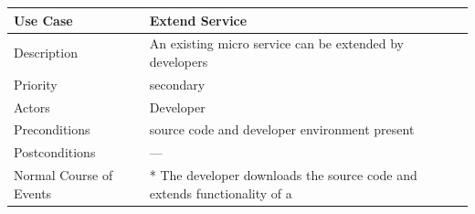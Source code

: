 \begin{longtable}[]{@{}ll@{}}
\toprule
\begin{minipage}[b]{0.27\columnwidth}\raggedright\strut
\textbf{Use Case}\strut
\end{minipage} & \begin{minipage}[b]{0.68\columnwidth}\raggedright\strut
\textbf{Extend Service}\strut
\end{minipage}\tabularnewline
\midrule
\endhead
\begin{minipage}[t]{0.27\columnwidth}\raggedright\strut
Description\strut
\end{minipage} & \begin{minipage}[t]{0.68\columnwidth}\raggedright\strut
An existing micro service can be extended by developers\strut
\end{minipage}\tabularnewline
\begin{minipage}[t]{0.27\columnwidth}\raggedright\strut
Priority\strut
\end{minipage} & \begin{minipage}[t]{0.68\columnwidth}\raggedright\strut
secondary\strut
\end{minipage}\tabularnewline
\begin{minipage}[t]{0.27\columnwidth}\raggedright\strut
Actors\strut
\end{minipage} & \begin{minipage}[t]{0.68\columnwidth}\raggedright\strut
Developer\strut
\end{minipage}\tabularnewline
\begin{minipage}[t]{0.27\columnwidth}\raggedright\strut
Preconditions\strut
\end{minipage} & \begin{minipage}[t]{0.68\columnwidth}\raggedright\strut
source code and developer environment present\strut
\end{minipage}\tabularnewline
\begin{minipage}[t]{0.27\columnwidth}\raggedright\strut
Postconditions\strut
\end{minipage} & \begin{minipage}[t]{0.68\columnwidth}\raggedright\strut
---\strut
\end{minipage}\tabularnewline
\begin{minipage}[t]{0.27\columnwidth}\raggedright\strut
Normal Course of Events\strut
\end{minipage} & \begin{minipage}[t]{0.68\columnwidth}\raggedright\strut
* The developer downloads the source code and extends functionality of a

\end{minipage}
\end{longtable}
